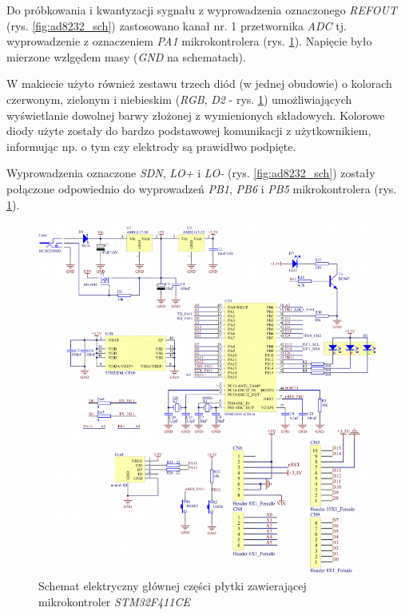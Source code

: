 Do próbkowania i kwantyzacji sygnału z wyprowadzenia oznaczonego \textit{REFOUT} (rys. \ref{fig:ad8232_sch})
zastosowano kanał nr. 1 przetwornika \textit{ADC} tj. wyprowadzenie z oznaczeniem \textit{PA1} mikrokontrolera 
(rys. \ref{fig:f411_main}). Napięcie było mierzone wzlgędem masy (\textit{GND} na schematach).

W makiecie użyto również zestawu trzech diód (w jednej obudowie) o kolorach czerwonym, zielonym i niebieskim (\textit{RGB}, \textit{D2} - rys. \ref{fig:f411_main}) umożliwiających wyświetlanie dowolnej barwy złożonej z wymienionych składowych. Kolorowe diody użyte zostały do bardzo podstawowej komunikacji z użytkownikiem, informując np. o tym czy elektrody są prawidłwo podpięte.

Wyprowadzenia oznaczone \textit{SDN}, \textit{LO+} i \textit{LO-} (rys. \ref{fig:ad8232_sch}) zostały połączone odpowiednio 
do wyprowadzeń \textit{PB1}, \textit{PB6} i \textit{PB5} mikrokontrolera (rys. \ref{fig:f411_main}).

\begin{figure}[h!]
    \centering 
    \includegraphics[scale=0.65]{pl/media/f411_main.png}
    \caption{Schemat elektryczny głównej części płytki \cite{NUCLEO} zawierającej mikrokontroler \textit{STM32F411CE}}
    \label{fig:f411_main}
\end{figure}


